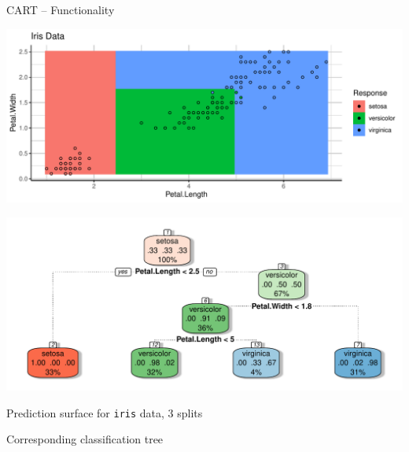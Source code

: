 \documentclass[11pt,compress,t,notes=noshow, xcolor=table]{beamer}
\let\code=\texttt
\begin{document}
\begin{frame}{CART -- Functionality}
\begin{minipage}{0.5\textwidth}
  \includegraphics[width=\textwidth]{figure/cart-partition}
\end{minipage}%
\begin{minipage}{0.5\textwidth}
  \includegraphics[width=\textwidth]{figure/cart-tree}
\end{minipage}
\begin{minipage}{0.5\textwidth}
  \tiny Prediction surface for \code{iris} data, 3 splits 
\end{minipage}%
\begin{minipage}{0.5\textwidth}
  \tiny Corresponding classification tree
\end{minipage}

\end{frame}

\end{document}
